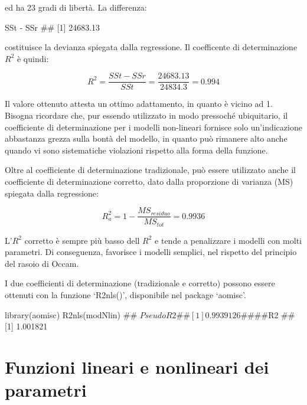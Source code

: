 \documentclass[a4paper,12pt,oneside]{book}
\newenvironment{Shaded}{\begin{snugshade}}{\end{snugshade}}
\newcommand{\SpecialCharTok}[1]{#1}
\newcommand{\DocumentationTok}[1]{#1}
\newcommand{\FunctionTok}[1]{#1}
\newcommand{\NormalTok}[1]{#1}
\begin{document}
ed ha 23 gradi di libertà. La differenza:

\begin{Shaded}
\begin{Highlighting}[]
\NormalTok{SSt }\SpecialCharTok{{-}}\NormalTok{ SSr}
\DocumentationTok{\#\# [1] 24683.13}
\end{Highlighting}
\end{Shaded}

costituisce la devianza spiegata dalla regressione. Il coefficente di determinazione \(R^2\) è quindi:

\[R^2 = \frac{SSt - SSr}{SSt} = \frac{24683.13}{24834.3} = 0.994\]

Il valore ottenuto attesta un ottimo adattamento, in quanto è vicino ad 1. Bisogna ricordare che, pur essendo utilizzato in modo pressoché ubiquitario, il coefficiente di determinazione per i modelli non-lineari fornisce solo un'indicazione abbastanza grezza sulla bontà del modello, in quanto può rimanere alto anche quando vi sono sistematiche violazioni rispetto alla forma della funzione.

Oltre al coefficiente di determinazione tradizionale, può essere utilizzato anche il coefficiente di determinazione corretto, dato dalla proporzione di varianza (MS) spiegata dalla regressione:

\[R_a^2  = 1 - \frac{MS_{residuo} }{MS_{tot} } = 0.9936\]

L'\(R^2\) corretto è sempre più basso dell \(R^2\) e tende a penalizzare i modelli con molti parametri. Di conseguenza, favorisce i modelli semplici, nel rispetto del principio del rasoio di Occam.

I due coefficienti di determinazione (tradizionale e corretto) possono essere ottenuti con la funzione `R2nls()', disponibile nel package `aomisc'.

\begin{Shaded}
\begin{Highlighting}[]
\FunctionTok{library}\NormalTok{(aomisc)}
\FunctionTok{R2nls}\NormalTok{(modNlin)}
\DocumentationTok{\#\# $PseudoR2}
\DocumentationTok{\#\# [1] 0.9939126}
\DocumentationTok{\#\# }
\DocumentationTok{\#\# $R2}
\DocumentationTok{\#\# [1] 1.001821}
\end{Highlighting}
\end{Shaded}

\hypertarget{funzioni-lineari-e-nonlineari-dei-parametri}{%
\section{Funzioni lineari e nonlineari dei parametri}\label{funzioni-lineari-e-nonlineari-dei-parametri}}
\end{document}

